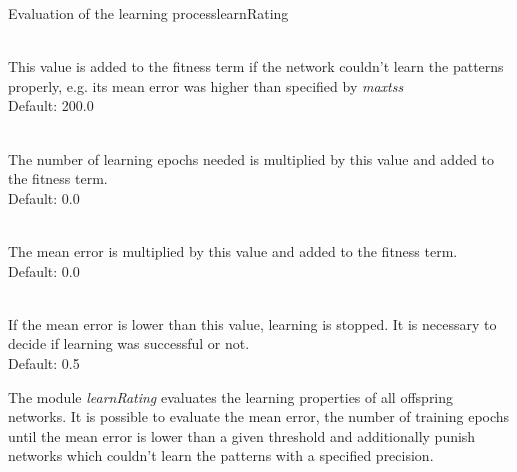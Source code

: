 \begin{moduledoc}{Evaluation of the learning process}{learnRating}

\item[\KeyWord{noLearnRating} \optParam{f}]~\\
This value is added to the fitness term if the network couldn't
learn the patterns properly, e.g. its mean error was higher
than specified by {\it maxtss}\\
Default: 200.0

\item[\KeyWord{epochRating} \optParam{f}]~\\
The number of learning epochs needed is multiplied by this value and added to
the fitness term.\\
Default: 0.0

\item[\KeyWord{tssRating} \optParam{f}]~\\ 
The mean error is multiplied by this value and added to the fitness term.\\
Default: 0.0

\item[\KeyWord{maxtss} \optParam{f}]~\\ 
If the mean error is lower than this value, learning is stopped.
It is necessary to decide if learning was successful or not.\\
Default: 0.5


\end{moduledoc}


The module {\it learnRating} evaluates the learning properties of
all offspring networks. It is possible to evaluate the mean error,
the number of training epochs until the mean error is lower
than a given threshold and additionally punish networks which couldn't learn
the patterns with a specified precision.


